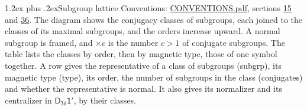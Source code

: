 \documentclass[10pt,a4paper]{article}
\makeatletter
\renewcommand\section{\@startsection{section}{1}{\z@}{-3ex plus -1ex minus -.2ex}%
  {1.2ex plus .2ex}{\normalfont\large\sffamily\bfseries\color{parttitle}}}
\numberwithin{equation}{section}
\newcommand{\grp}[1]{\mathsf{#1}}
\makeatother
\begin{document}
\section{Subgroup lattice}\label{s:subgroups}
Conventions: \href{../../CONVENTIONS.pdf}{CONVENTIONS.pdf}, sections \href{../../../rotation/CONVENTIONS.pdf\#conv.15}{15} and \href{../../CONVENTIONS.pdf\#conv.36}{36}.
The diagram shows the conjugacy classes of subgroups, each joined to the classes of its maximal subgroups, and the orders increase upward. \label{n:index.conjugates.c}\label{n:mark.conjugates}A normal subgroup is framed, and ${\times}c$ is the number $c > 1$ of conjugate subgroups. The table lists the classes by order, then by magnetic type, those of one symbol together. \label{n:head.subgroup}\label{n:head.magnetic.type}\label{n:head.order}\label{n:head.conjugates}\label{n:head.normal}A row gives the representative of a class of subgroups (subgrp), its magnetic type (type), its order, the number of subgroups in the class (conjugates) and whether the representative is normal. \label{n:head.normalizer}\label{n:head.centralizer}It also gives its normalizer and its centralizer in $\grp{D_{3d}1'}$, by their classes. 
\end{document}
